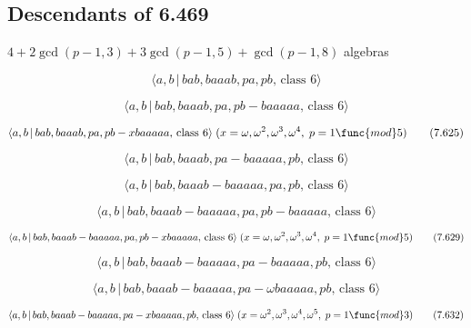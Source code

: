\documentclass[10pt]{article}
\begin{document}
\subsection{Descendants of 6.469}

$4+2\gcd (p-1,3)+3\gcd (p-1,5)+\gcd (p-1,8)$ algebras

\begin{equation}
\langle a,b\,|\,bab,baaab,pa,pb,\,\text{class }6\rangle  \tag{7.623}
\end{equation}

\begin{equation}
\langle a,b\,|\,bab,baaab,pa,pb-baaaaa,\,\text{class }6\rangle  \tag{7.624}
\end{equation}

\begin{equation}
\langle a,b\,|\,bab,baaab,pa,pb-xbaaaaa,\,\text{class }6\rangle \;(x=\omega
,\omega ^{2},\omega ^{3},\omega ^{4},\;p=1\func{mod}5)  \tag{7.625}
\end{equation}

\begin{equation}
\langle a,b\,|\,bab,baaab,pa-baaaaa,pb,\,\text{class }6\rangle  \tag{7.626}
\end{equation}

\begin{equation}
\langle a,b\,|\,bab,baaab-baaaaa,pa,pb,\,\text{class }6\rangle  \tag{7.627}
\end{equation}

\begin{equation}
\langle a,b\,|\,bab,baaab-baaaaa,pa,pb-baaaaa,\,\text{class }6\rangle 
\tag{7.628}
\end{equation}

\begin{equation}
\langle a,b\,|\,bab,baaab-baaaaa,pa,pb-xbaaaaa,\,\text{class }6\rangle
\;(x=\omega ,\omega ^{2},\omega ^{3},\omega ^{4},\;p=1\func{mod}5) 
\tag{7.629}
\end{equation}

\begin{equation}
\langle a,b\,|\,bab,baaab-baaaaa,pa-baaaaa,pb,\,\text{class }6\rangle 
\tag{7.630}
\end{equation}

\begin{equation}
\langle a,b\,|\,bab,baaab-baaaaa,pa-\omega baaaaa,pb,\,\text{class }6\rangle
\tag{7.631}
\end{equation}

\begin{equation}
\langle a,b\,|\,bab,baaab-baaaaa,pa-xbaaaaa,pb,\,\text{class }6\rangle
\;(x=\omega ^{2},\omega ^{3},\omega ^{4},\omega ^{5},\;p=1\func{mod}3) 
\tag{7.632}
\end{equation}
\end{document}
